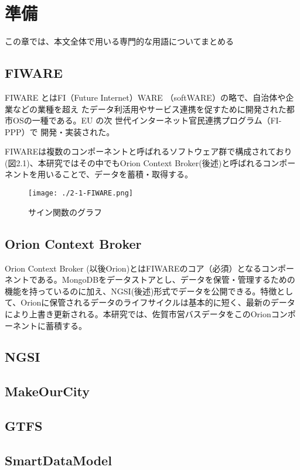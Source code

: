 \documentclass[a4paper, 12pt]{jsreport}
\begin{document}
  \chapter{準備}
  この章では、本文全体で用いる専門的な用語についてまとめる

  \section{FIWARE}
  \par FIWARE とはFI（Future Internet）WARE （softWARE）の略で、自治体や企業などの業種を超え
  たデータ利活用やサービス連携を促すために開発された都市OSの一種である。EU の次 世代インターネット官民連携プログラム（FI-PPP）で
  開発・実装された。 \par FIWAREは複数のコンポーネントと呼ばれるソフトウェア群で構成されており(図2.1)、本研究ではその中でもOrion
  Context Broker(後述)と呼ばれるコンポーネントを用いることで、データを蓄積・取得する。

  \begin{figure}[H]
    \begin{center}
      \texttt{[image: ./2-1-FIWARE.png]}
      \caption{サイン関数のグラフ}
    \end{center}
  \end{figure}

  \section{Orion Context Broker}
  Orion Context Broker (以後Orion)とはFIWAREのコア（必須）となるコンポーネントである。MongoDBをデータストアとし、データを保管・管理するための機能を持っているのに加え、NGSI(後述)形式でデータを公開できる。特徴として、Orionに保管されるデータのライフサイクルは基本的に短く、最新のデータにより上書き更新される。本研究では、佐賀市営バスデータをこのOrionコンポーネントに蓄積する。
  \section{NGSI}


  \section{MakeOurCity}
  \section{GTFS}
  \section{SmartDataModel}
\end{document}
